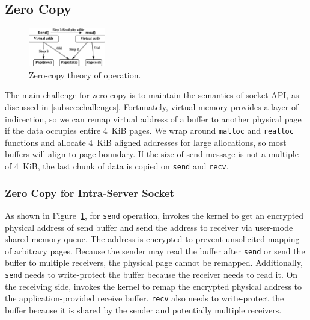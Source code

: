 

\subsection{Zero Copy}
\label{subsec:zerocopy}

\begin{figure}[t]
	\centering
	\includegraphics[width=0.3\textwidth]{images/zerocopy}
	\caption{Zero-copy theory of operation.}
	\label{fig:zerocopy}
\end{figure}

The main challenge for zero copy is to maintain the semantics of socket API, as discussed in \ref{subsec:challenges}.
Fortunately, virtual memory provides a layer of indirection, so we can remap virtual address of a buffer to another physical page if the data occupies entire 4~KiB pages.
We wrap around \texttt{malloc} and \texttt{realloc} functions and allocate 4~KiB aligned addresses for large allocations, so most buffers will align to page boundary.
If the size of send message is not a multiple of 4~KiB, the last chunk of data is copied on \texttt{send} and \texttt{recv}.

\subsubsection{Zero Copy for Intra-Server Socket}
\label{subsec:zero-copy-intra}

As shown in Figure~\ref{fig:zerocopy}, for \texttt{send} operation, \libipc{} invokes the kernel to get an encrypted physical address of send buffer and send the address to receiver via user-mode shared-memory queue.
The address is encrypted to prevent unsolicited mapping of arbitrary pages.
Because the sender may read the buffer after \texttt{send} or send the buffer to multiple receivers, the physical page cannot be remapped.
Additionally, \texttt{send} needs to write-protect the buffer because the receiver needs to read it.
On the receiving side, \libipc{} invokes the kernel to remap the encrypted physical address to the application-provided receive buffer.
\texttt{recv} also needs to write-protect the buffer because it is shared by the sender and potentially multiple receivers.

